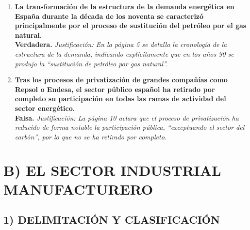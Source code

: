 \begin{enumerate}[label=\textbf{\arabic*.}]
    \item \textbf{La transformación de la estructura de la demanda energética en España durante la década de los noventa se caracterizó principalmente por el proceso de sustitución del petróleo por el gas natural.} \\
    \textbf{Verdadera.} \textit{Justificación: En la página 5 se detalla la cronología de la estructura de la demanda, indicando explícitamente que en los años 90 se produjo la ``sustitución de petróleo por gas natural''.}

    \item \textbf{Tras los procesos de privatización de grandes compañías como Repsol o Endesa, el sector público español ha retirado por completo su participación en todas las ramas de actividad del sector energético.} \\
    \textbf{Falsa.} \textit{Justificación: La página 10 aclara que el proceso de privatización ha reducido de forma notable la participación pública, ``exceptuando el sector del carbón'', por lo que no se ha retirado por completo.}

\end{enumerate}

\section*{B) EL SECTOR INDUSTRIAL MANUFACTURERO}

\subsection*{1) DELIMITACIÓN Y CLASIFICACIÓN}


